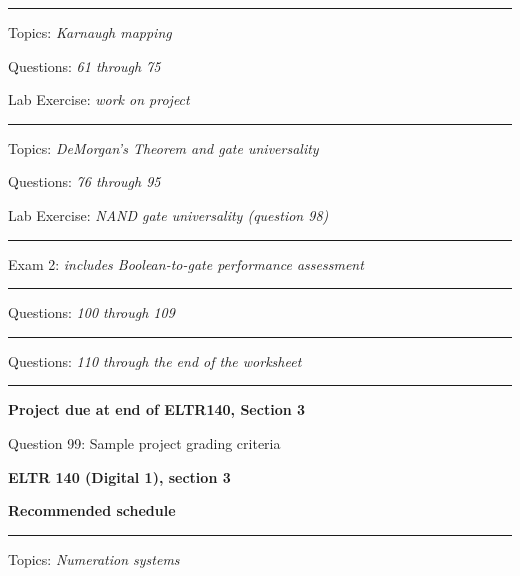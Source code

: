 \vskip 10pt
\hrule \vskip 5pt
\noindent
{}

\hskip 10pt Topics: {\it Karnaugh mapping}
 
\hskip 10pt Questions: {\it 61 through 75}
 
\hskip 10pt Lab Exercise: {\it work on project}
 
\vskip 10pt
\hrule \vskip 5pt
\noindent
{}

\hskip 10pt Topics: {\it DeMorgan's Theorem and gate universality}
 
\hskip 10pt Questions: {\it 76 through 95}
 
\hskip 10pt Lab Exercise: {\it NAND gate universality (question 98)}
 
\vskip 10pt
\hrule \vskip 5pt
\noindent
{}

\hskip 10pt Exam 2: {\it includes Boolean-to-gate performance assessment}
 
\vskip 10pt
\hrule \vskip 5pt
\noindent
{}

\hskip 10pt Questions: {\it 100 through 109}
 
\vskip 10pt
\hrule \vskip 5pt
\noindent
{}

\hskip 10pt Questions: {\it 110 through the end of the worksheet}
 
\vskip 10pt
\hrule \vskip 5pt
\noindent
{}

\hskip 10pt {\bf Project due at end of ELTR140, Section 3}
 
\hskip 10pt Question 99: Sample project grading criteria
 
\vskip 10pt









\vfil \eject

\centerline{\bf ELTR 140 (Digital 1), section 3} \bigskip 
 
\vskip 10pt

\noindent
{\bf Recommended schedule}

\vskip 5pt

\hrule \vskip 5pt
\noindent
{}

\hskip 10pt Topics: {\it Numeration systems}
 
